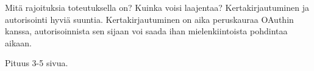 Mitä rajoituksia toteutuksella on? Kuinka voisi laajentaa? Kertakirjautuminen ja autorisointi hyviä suuntia. Kertakirjautuminen on aika peruskauraa OAuthin kanssa, autorisoinnista sen sijaan voi saada ihan mielenkiintoista pohdintaa aikaan.

Pituus 3-5 sivua.